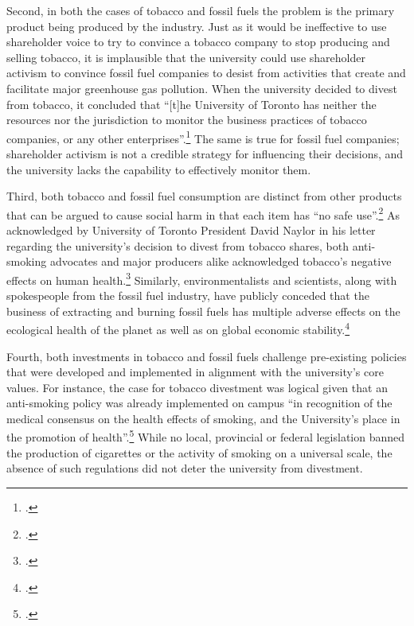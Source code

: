 Second, in both the cases of tobacco and fossil fuels the problem is the primary product being produced by the industry.
Just as it would be ineffective to use shareholder voice to try to convince a tobacco company to stop producing and selling tobacco, it is implausible that the university could use shareholder activism to convince fossil fuel companies to desist from activities that create and facilitate major greenhouse gas pollution.
When the university decided to divest from tobacco, it concluded that ``[t]he University of Toronto has neither the resources nor the jurisdiction to monitor the business practices of tobacco companies, or any other enterprises''.\footcite[][p. 7]{TobaccoReport_2007}
The same is true for fossil fuel companies; shareholder activism is not a credible strategy for influencing their decisions, and the university lacks the capability to effectively monitor them.



Third, both tobacco and fossil fuel consumption are distinct from other products that can be argued to cause social harm in that each item has ``no safe use''.\footcite[See: ][p. 9]{TobaccoReport_2007}
As acknowledged by University of Toronto President David Naylor in his letter regarding the university's decision to divest from tobacco shares, both anti-smoking advocates and major producers alike acknowledged tobacco's negative effects on human health.\footcite[][]{TStarSellOff}  
Similarly, environmentalists and scientists, along with spokespeople from the fossil fuel industry, have publicly conceded that the business of extracting and burning fossil fuels has multiple adverse effects on the ecological health of the planet as well as on global economic stability.\footcite[See, for example: ][p. 3--18]{OilIndustryVanDenHove}



Fourth, both investments in tobacco and fossil fuels challenge pre-existing policies that were developed and implemented in alignment with the university's core values. 
For instance, the case for tobacco divestment was logical given that an anti-smoking policy was already implemented on campus ``in recognition of the medical consensus on the health effects of smoking, and the University's place in the promotion of health''.\footcite[See: ][p. 9]{TobaccoReport_2007}
While no local, provincial or federal legislation banned the production of cigarettes or the activity of smoking on a universal scale, the absence of such regulations did not deter the university from divestment. 



